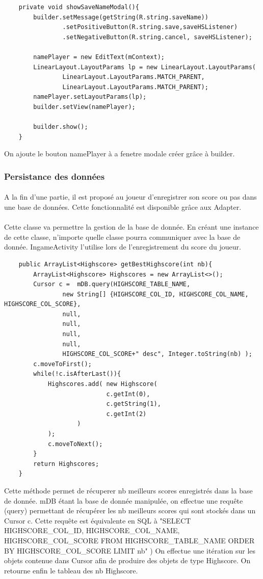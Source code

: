 \documentclass{article}
\begin{document}
\begin{verbatim}
    private void showSaveNameModal(){
        builder.setMessage(getString(R.string.saveName))
                .setPositiveButton(R.string.save,saveHSListener)
                .setNegativeButton(R.string.cancel, saveHSListener);

        namePlayer = new EditText(mContext);
        LinearLayout.LayoutParams lp = new LinearLayout.LayoutParams(
                LinearLayout.LayoutParams.MATCH_PARENT,
                LinearLayout.LayoutParams.MATCH_PARENT);
        namePlayer.setLayoutParams(lp);
        builder.setView(namePlayer);

        builder.show();
    }
\end{verbatim}
On ajoute le bouton namePlayer à a fenetre modale créer grâce à builder.


\subsubsection{Persistance des données}
\paragraph{}
A la fin d'une partie, il est proposé au joueur d'enregistrer son score ou pas dans une base de données. Cette fonctionnalité est disponible grâce aux Adapter.

\paragraph{}
Cette classe va permettre la gestion de la base de donnée.
En créant une instance de cette classe, n'importe quelle classe pourra communiquer avec la base de donnée. IngameActivity l'utilise lors de l'enregistrement du score du joueur.
\begin{verbatim}
    public ArrayList<Highscore> getBestHighscore(int nb){
        ArrayList<Highscore> Highscores = new ArrayList<>();
        Cursor c =  mDB.query(HIGHSCORE_TABLE_NAME,
                new String[] {HIGHSCORE_COL_ID, HIGHSCORE_COL_NAME, HIGHSCORE_COL_SCORE},
                null,
                null,
                null,
                null,
                HIGHSCORE_COL_SCORE+" desc", Integer.toString(nb) );
        c.moveToFirst();
        while(!c.isAfterLast()){
            Highscores.add( new Highscore(
                            c.getInt(0),
                            c.getString(1),
                            c.getInt(2)
                    )
            );
            c.moveToNext();
        }
        return Highscores;
    }
    \end{verbatim}
Cette méthode permet de récuperer nb meilleurs scores enregistrés dans la base de donnée. mDB étant la base de donnée manipulée, on effectue une requête (query) permettant de récupérer les nb meilleurs scores qui sont stockés dans un Cursor c. Cette requête est équivalente en SQL à "SELECT HIGHSCORE\_COL\_ID, HIGHSCORE\_COL\_NAME, HIGHSCORE\_COL\_SCORE FROM HIGHSCORE\_TABLE\_NAME ORDER BY HIGHSCORE\_COL\_SCORE LIMIT nb" )
On effectue une itération sur les objets contenue dans Cursor afin de produire des objets de type Highscore. On retourne enfin le tableau des nb Highscore.
\end{document}
